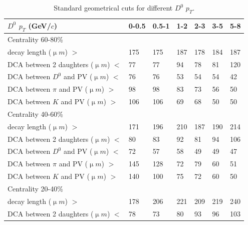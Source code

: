 \begin{table}[htp]
  \centering
  \caption{Standard geometrical cuts for different $D^0$ $p_T$.}
  \label{geometryCuts}
  \begin{center}
    \begin{tabular}{l|l|l|l|l|l|l}
      $D^0$ $p_T$ (GeV/$c$) & 0-0.5 & 0.5-1 & 1-2 & 2-3 & 3-5 & 5-8\\ \hline
      Centrality  60-80\% & &  & &  & & \\ \hline
      decay length (${\upmu}m$) $>$ & 175 & 175 & 187 & 178 & 184 & 187\\ \hline
      DCA between 2 daughters (${\upmu}m$) $<$ & 77 & 77 & 94 & 78 & 81 & 120\\ \hline
      DCA between $D^0$ and PV (${\upmu}m$) $<$ & 76 & 76 & 53 & 54 & 54 & 42\\ \hline
      DCA between $\pi$ and PV (${\upmu}m$) $>$ & 98 & 98 & 83 & 73 & 56 & 50\\ \hline
      DCA between $K$ and PV (${\upmu}m$) $>$ & 106 & 106 & 69 & 68 & 50 & 50\\ \hline
      Centrality  40-60\% &  &  &  &  & & \\ \hline
      decay length (${\upmu}m$) $>$ & 171 & 196 & 210 & 187 & 190 & 214\\ \hline
      DCA between 2 daughters (${\upmu}m$) $<$ & 80 & 83 & 92 & 81 & 94 & 106\\ \hline
      DCA between $D^0$ and PV (${\upmu}m$) $<$ & 72 & 57 & 58 & 49 & 49 & 47\\ \hline
      DCA between $\pi$ and PV (${\upmu}m$) $>$ & 145 & 128 & 72 & 79 & 60 & 51\\ \hline
      DCA between $K$ and PV (${\upmu}m$) $>$ & 140 & 100 & 75 & 72 & 60 & 50\\ \hline
      Centrality  20-40\% &  &  &  &  & & \\ \hline
      decay length (${\upmu}m$) $>$ & 178 & 206 & 221 & 209 & 219 & 240\\ \hline
      DCA between 2 daughters (${\upmu}m$) $<$ & 78 & 73 & 80 & 93 & 96 & 103\\ \hline

\end{tabular}
\end{center}
\end{table}
